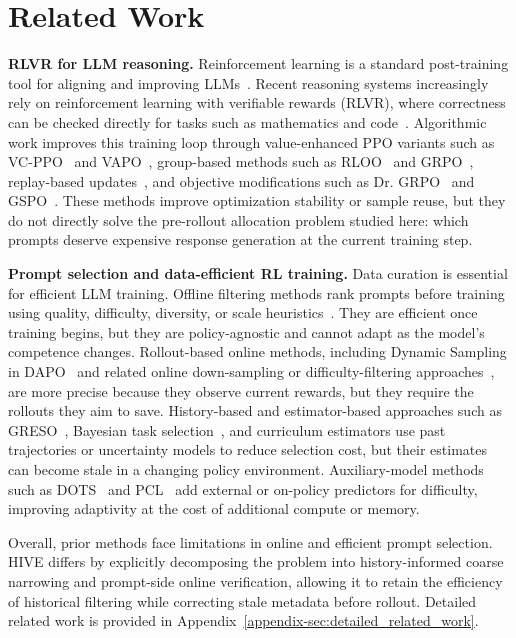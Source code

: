 \section{Related Work}
\label{sec:related-work}

\textbf{RLVR for LLM reasoning.}
Reinforcement learning is a standard post-training tool for aligning and improving LLMs~\cite{christiano2017deep,bai2022training,ouyang2022training,rafailov2023direct}. Recent reasoning systems increasingly rely on reinforcement learning with verifiable rewards (RLVR), where correctness can be checked directly for tasks such as mathematics and code~\cite{guo2025deepseek,hu2025reinforce++,liu2503understanding,jaech2024openai,Zhang2025SRPOAC}. Algorithmic work improves this training loop through value-enhanced PPO variants such as VC-PPO~\cite{yuan2025s} and VAPO~\cite{yue2025vapo}, group-based methods such as RLOO~\cite{ahmadian2024back} and GRPO~\cite{shao2024deepseekmath}, replay-based updates~\cite{liang2025squeeze,li2025repo,zhang2025rlep}, and objective modifications such as Dr. GRPO~\cite{liu2503understanding} and GSPO~\cite{zheng2025group}. These methods improve optimization stability or sample reuse, but they do not directly solve the pre-rollout allocation problem studied here: which prompts deserve expensive response generation at the current training step.

\textbf{Prompt selection and data-efficient RL training.}
Data curation is essential for efficient LLM training. Offline filtering methods rank prompts before training using quality, difficulty, diversity, or scale heuristics~\cite{Wang2025ReinforcementLF,Fatemi2025ConciseRV,Li2025LIMRLI,shi2025efficient,tang2025towards,zhou2023lima,ye2025limo}. They are efficient once training begins, but they are policy-agnostic and cannot adapt as the model's competence changes. Rollout-based online methods, including Dynamic Sampling in DAPO~\cite{yu2025dapo} and related online down-sampling or difficulty-filtering approaches~\cite{meng2025mm,foster2025learning,xu2025not,lin2025cppo,sun2025efficient,bae2025online}, are more precise because they observe current rewards, but they require the rollouts they aim to save. History-based and estimator-based approaches such as GRESO~\cite{zheng2025act}, Bayesian task selection~\cite{chen2025self,zeng2025cures,shen2025bots}, and curriculum estimators use past trajectories or uncertainty models to reduce selection cost, but their estimates can become stale in a changing policy environment. Auxiliary-model methods such as DOTS~\cite{sun2025dots} and PCL~\cite{Gao2025PCL} add external or on-policy predictors for difficulty, improving adaptivity at the cost of additional compute or memory.

Overall, prior methods face limitations in online and efficient prompt selection. HIVE differs by explicitly decomposing the problem into history-informed coarse narrowing and prompt-side online verification, allowing it to retain the efficiency of historical filtering while correcting stale metadata before rollout. Detailed related work is provided in Appendix~\ref{appendix-sec:detailed_related_work}.
